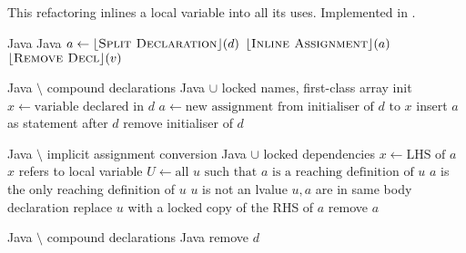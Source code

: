 \subsection{}
This refactoring inlines a local variable into all its uses. Implemented in .

\begin{algorithm}
\caption{$\refactoring{Inline Temp}(d : \type{LocalVar})$}
\begin{algorithmic}[1]
\REQUIRE Java
\ENSURE Java
\medskip
\STATE $a \leftarrow \lfloor\textsc{Split Declaration}\rfloor(d)$
\STATE $\lfloor\textsc{Inline Assignment}\rfloor(a)$
\STATE $\lfloor\textsc{Remove Decl}\rfloor(v)$
\end{algorithmic}
\end{algorithm}

\begin{algorithm}
\caption{$\refactoring{Split Declaration}(d : \type{LocalVar}) : \option{\type{Assignment}}$}
\begin{algorithmic}[1]
\REQUIRE Java $\setminus$ compound declarations
\ENSURE Java $\cup$ locked names, first-class array init
\medskip
{}
  \STATE $x \leftarrow \text{variable declared in $d$}$
  \STATE $a \leftarrow \text{new assignment from initialiser of $d$ to $x$}$
  \STATE insert $a$ as statement after $d$
  \STATE remove initialiser of $d$
  \RETURN {}
\ELSE
  \RETURN \None
\ENDIF
\end{algorithmic}
\end{algorithm}

\begin{algorithm}
\caption{$\refactoring{Inline Assignment}(a : \type{Assignment})$}
\begin{algorithmic}[1]
\REQUIRE Java $\setminus$ implicit assignment conversion
\ENSURE Java $\cup$ locked dependencies
\medskip
\STATE $x \leftarrow \text{LHS of $a$}$
\STATE \assert $x$ refers to local variable
\STATE $U \leftarrow \text{all $u$ such that $a$ is a reaching definition of $u$}$
  \STATE \assert $a$ is the only reaching definition of $u$
  \STATE \assert $u$ is not an lvalue
  \STATE \assert $u,a$ are in same body declaration
  \STATE replace $u$ with a locked copy of the RHS of $a$
\ENDFOR
{}
  \STATE remove $a$
\ENDIF
\end{algorithmic}
\end{algorithm}

\begin{algorithm}
\caption{$\refactoring{Remove Decl}(d : \type{LocalVar})$}
\begin{algorithmic}[1]
\REQUIRE Java $\setminus$ compound declarations
\ENSURE Java
\medskip
{}
  \STATE remove $d$
\ENDIF
\end{algorithmic}
\end{algorithm}
